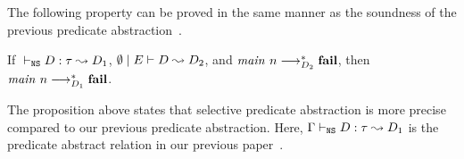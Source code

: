 The following property can be proved in the same manner as the soundness
of the previous predicate abstraction~\cite{KobayashiPLDI2011}.
\begin{proposition}
 If ${} \vdash_{\texttt{NS}} {D} : {\tau} \leadsto {D_1}$,
 ${\emptyset} \mid {E} \vdash {D} \leadsto {D_2}$, and
 ${\mathit{main}}~{n} \longrightarrow_{D_2}^* \mathbf{fail}$, then
 ${\mathit{main}}~{n} \longrightarrow_{D_1}^* \mathbf{fail}$.
\end{proposition}
The proposition above states that selective predicate abstraction is
more precise compared to our previous predicate abstraction.  Here,
${\Gamma} \vdash_{\texttt{NS}} {D} : {\tau} \leadsto {D_1}$ is the predicate abstract relation in
our previous paper~\cite{KobayashiPLDI2011}.


%
%
%
%
%
%
%
%
%
%
%
%
%
%
%
%
%
%





